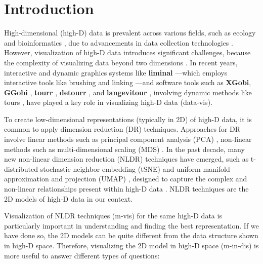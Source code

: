 \documentclass[
  12pt]{article}
\begin{document}
\newpage
{} %

\ifdefined\Shaded\renewenvironment{Shaded}{\begin{tcolorbox}[frame hidden, borderline west={3pt}{0pt}{shadecolor}, breakable, interior hidden, enhanced, sharp corners, boxrule=0pt]}{\end{tcolorbox}}\fi

\hypertarget{sec-intro}{%
\section{Introduction}\label{sec-intro}}

High-dimensional (high-D) data is prevalent across various fields, such
as ecology and bioinformatics \citep{Guo2023}, due to advancements in
data collection technologies \citep{Johnstone2009, ayesha2020overview}.
However, visualization of high-D data introduces significant challenges,
because the complexity of visualizing data beyond two dimensions
\citep{Jia2022}. In recent years, interactive and dynamic graphics
systems like \textbf{liminal} \citep{article21} ---which employs
interactive tools like brushing and linking \citep{article58}---and
software tools such as \textbf{XGobi}, \textbf{GGobi} \citep{article60},
\textbf{tourr} \citep{article61}, \textbf{detourr} \citep{article22},
and \textbf{langevitour} \citep{article09}, involving dynamic methods
like tours \citep{Asimov1985}, have played a key role in visualizing
high-D data (data-vis).

To create low-dimensional representations (typically in 2D) of high-D
data, it is common to apply dimension reduction (DR) techniques.
Approaches for DR involve linear methods such as principal component
analysis (PCA) \citep{Karl1901}, non-linear methods such as
multi-dimensional scaling (MDS) \citep{Torgerson1967}. In the past
decade, many new non-linear dimension reduction (NLDR) techniques have
emerged, such as t-distributed stochastic neighbor embedding (tSNE)
\citep{Laurens2008} and uniform manifold approximation and projection
(UMAP) \citep{Leland2018}, designed to capture the complex and
non-linear relationships present within high-D data
\citep{Johnstone2009}. NLDR techniques are the 2D models of high-D data
in our context.

Visualization of NLDR techniques (m-vis) \citep{article59} for the same
high-D data is particularly important in understanding and finding the
best representation. If we have done so, the 2D models can be quite
different from the data structure shown in high-D space. Therefore,
visualizing the 2D model in high-D space (m-in-dis) is more useful to
answer different types of questions:
\end{document}
